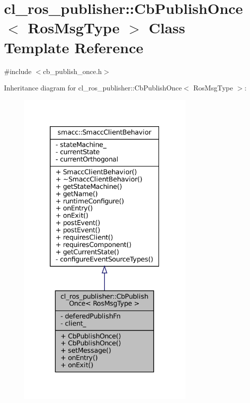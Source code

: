 \hypertarget{classcl__ros__publisher_1_1CbPublishOnce}{}\section{cl\+\_\+ros\+\_\+publisher\+:\+:Cb\+Publish\+Once$<$ Ros\+Msg\+Type $>$ Class Template Reference}
\label{classcl__ros__publisher_1_1CbPublishOnce}


{\ttfamily \#include $<$cb\+\_\+publish\+\_\+once.\+h$>$}



Inheritance diagram for cl\+\_\+ros\+\_\+publisher\+:\+:Cb\+Publish\+Once$<$ Ros\+Msg\+Type $>$\+:
\nopagebreak
\begin{figure}[H]
\begin{center}
\leavevmode
\includegraphics[width=244pt]{classcl__ros__publisher_1_1CbPublishOnce__inherit__graph}
\end{center}
\end{figure}


